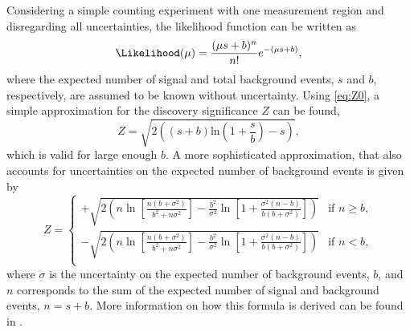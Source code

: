Considering a simple counting experiment with one measurement region and disregarding all uncertainties, the likelihood function can be written as
\begin{equation}
  \Likelihood(\mu) = \frac{(\mu s +b)^n}{n!} e^{-(\mu s+b)},
\end{equation}
where the expected number of signal and total background events, $s$ and $b$, respectively, are assumed to be known without uncertainty.
Using \cref{eq:Z0}, a simple approximation for the discovery significance $Z$ can be found,
\begin{equation}
    \label{eq:discovery-significance}
  Z = \sqrt{2 \left( \left(s + b\right) \text{ln}\left(1 + \frac{s}{b}\right) - s\right)},
\end{equation}
which is valid for large enough $b$.
A more sophisticated approximation, that also accounts for uncertainties on the expected number of background events is given by
\begin{equation}
    \label{eq:simple-sign}
    Z = 
    \begin{cases}
    + \sqrt{ 2 \left( n \ln \left[ \frac{n \left( b + \sigma^2 \right)}{b^2 + n \sigma^2} \right] - \frac{b^2}{\sigma^2} \ln \left[ 1 + \frac{\sigma^2 \left(n - b \right) }{b \left( b + \sigma ^2 \right) } \right] \right)   } & \text{if } n \geq b, \\
    - \sqrt{ 2 \left( n \ln \left[ \frac{n \left( b + \sigma^2 \right)}{b^2 + n \sigma^2} \right] - \frac{b^2}{\sigma^2} \ln \left[ 1 + \frac{\sigma^2 \left(n - b \right) }{b \left( b + \sigma ^2 \right) } \right] \right)   } & \text{if } n < b, \\
\end{cases}
\end{equation}
where $\sigma$ is the uncertainty on the expected number of background events, $b$, and $n$ corresponds to the sum of the expected number of signal and background events, $n = s+b$.
More information on how this formula is derived can be found in .

